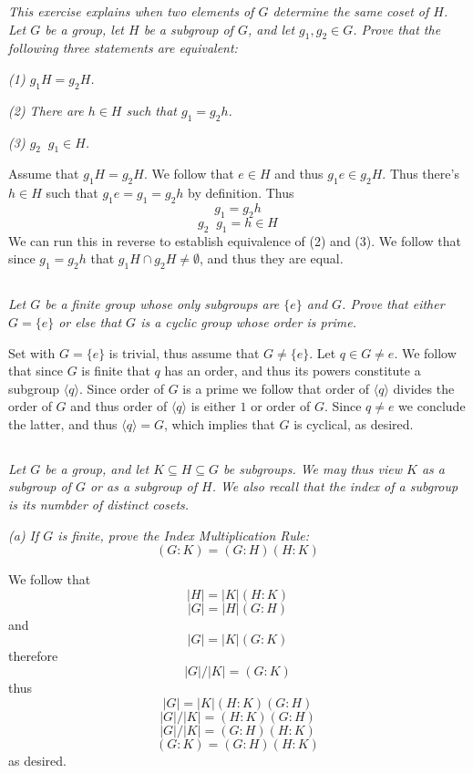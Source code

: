 \documentclass[11pt,oneside,titlepage]{book}
\DeclareMathOperator \inv {^{-1}}
\newcommand{\eangle}[1]{\langle #1 \rangle}
\newcommand{\set}[1]{\{ #1 \}}
\begin{document}
\textit{This exercise explains when two elements of $G$ determine the
  same coset of $H$. Let $G$ be a group, let $H$ be a subgroup of $G$,
  and let $g_1, g_2 \in G$. Prove that the following three statements
  are equivalent:}

\textit{(1) $g_1 H = g_2 H$. }

\textit{(2) There are $h \in H$ such that $g_1 = g_2 h$. }

\textit{(3) $g_2\inv g_1 \in H$. }

Assume that $g_1 H = g_2 H$. We follow that $e \in H$ and thus
$g_1 e \in g_2 H$. Thus there's $h \in H$ such that $g_1 e = g_1 = g_2 h$
by definition. Thus
$$g_1 = g_2 h$$
$$g_2 \inv g_1 = h \in H$$
We can run this in reverse to establish equivalence of (2) and (3).
We follow that since $g_1 = g_2 h$ that $g_1 H \cap g_2 H \neq \emptyset$,
and thus they are equal.

\subsection{}

\textit{Let $G$ be a finite group whose only subgroups are $\set{e}$
and $G$.  Prove that either $G = \set{e}$ or else that $G$ is a cyclic
group whose order is prime.}

Set with $G = \set{e}$ is trivial, thus assume that $G \neq \set{e}$.
Let $q \in G \neq e$. We follow that since $G$ is finite that $q$ has
an order, and thus its powers constitute a subgroup
$\eangle{q}$. Since order of $G$ is a prime we follow that order of
$\eangle{q}$ divides the order of $G$ and thus order of  $\eangle{q}$ is
either $1$ or order of $G$. Since $q \neq e$ we conclude the latter,
and thus $\eangle{q} = G$, which implies that $G$ is cyclical, as desired.

\subsection{}

\textit{Let $G$ be a group, and let $K \subseteq H \subseteq G$ be
subgroups. We may thus view $K$ as a subgroup of $G$ or as a subgroup
of $H$. We also recall that the index of a subgroup is its numbder of
distinct cosets. }

\textit{(a) If $G$ is finite, prove the Index Multiplication Rule:
  $$(G:K) = (G:H) (H:K)$$
}

We follow that
$$|H| = |K| (H:K)$$
$$|G| = |H| (G:H)$$
and
$$|G| = |K| (G:K)$$
therefore
$$|G| / |K| =  (G:K)$$
thus
$$|G| = |K| (H:K) (G:H)$$
$$|G| / |K| =  (H:K) (G:H)$$
$$|G| / |K| =  (G:H) (H:K) $$
$$(G:K) =  (G:H) (H:K) $$
as desired.
\end{document}
